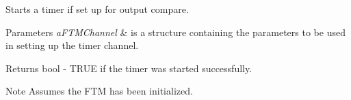 Starts a timer if set up for output compare. 


\begin{DoxyParams}{Parameters}
{\em a\+F\+T\+M\+Channel} & is a structure containing the parameters to be used in setting up the timer channel. \\
\hline
\end{DoxyParams}
\begin{DoxyReturn}{Returns}
bool -\/ T\+R\+U\+E if the timer was started successfully. 
\end{DoxyReturn}
\begin{DoxyNote}{Note}
Assumes the F\+T\+M has been initialized. 
\end{DoxyNote}
